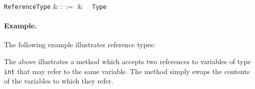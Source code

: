 \begin{syntax}
  \verb+ReferenceType+ & $::=$ & \token{\&}\ \ \verb+Type+\\
\end{syntax}

\paragraph{Example.} The following example illustrates reference types:



The above illustrates a method which accepts two references to variables of type \lstinline{int} that may refer to the same variable.  The method simply swaps the contents of the variables to which they refer.






